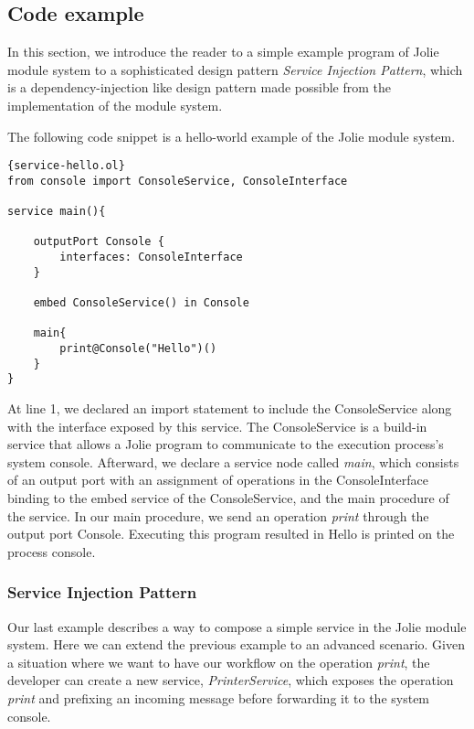 \subsection{Code example}

In this section, we introduce the reader to a simple example program of Jolie module system to a sophisticated design pattern \textit{Service Injection Pattern}, which is a dependency-injection like design pattern made possible from the implementation of the module system.

The following code snippet is a hello-world example of the Jolie module system.

\begin{listing}[ht]
    \lstset{language=Jolie,
        style=codeStyle,
        numbers=left,
        firstnumber=1
    }
    \begin{lstlisting}[frame=tlrb,
basicstyle=\footnotesize]{service-hello.ol}
from console import ConsoleService, ConsoleInterface

service main(){

    outputPort Console {
        interfaces: ConsoleInterface
    }

    embed ConsoleService() in Console

    main{
        print@Console("Hello")()
    }
}
\end{lstlisting}

\end{listing}

At line 1, we declared an import statement to include the ConsoleService along with the interface exposed by this service. The ConsoleService is a build-in service that allows a Jolie program to communicate to the execution process's system console. Afterward, we declare a service node called \textit{main}, which consists of an output port with an assignment of operations in the ConsoleInterface binding to the embed service of the ConsoleService, and the main procedure of the service. 
In our main procedure, we send an operation \textit{print} through the output port Console. Executing this program resulted in Hello is printed on the process console.

\subsubsection{Service Injection Pattern}

Our last example describes a way to compose a simple service in the Jolie module system. Here we can extend the previous example to an advanced scenario. Given a situation where we want to have our workflow on the operation \textit{print}, the developer can create a new service, \textit{PrinterService}, which exposes the operation \textit{print} and prefixing an incoming message before forwarding it to the system console.

